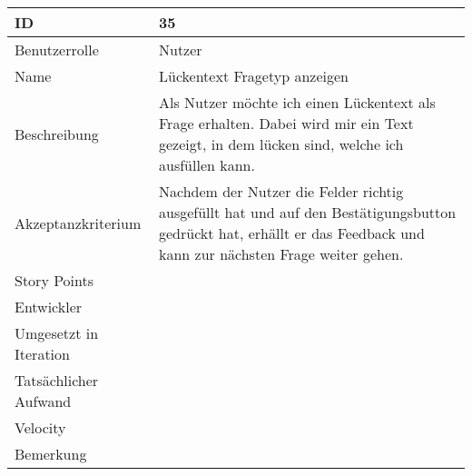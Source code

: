 \begin{tabularx}{\textwidth}{|p{}|X|}
	\hline
	ID & 35 \\
	\hline
	Benutzerrolle & Nutzer \\
	\hline
	Name & Lückentext Fragetyp anzeigen\\
	\hline
	Beschreibung & Als Nutzer möchte ich einen Lückentext als Frage erhalten. Dabei wird mir ein Text gezeigt, in dem lücken sind, welche ich ausfüllen kann. \\
	\hline
	Akzeptanzkriterium & Nachdem der Nutzer die Felder richtig ausgefüllt hat und auf den Bestätigungsbutton gedrückt hat, erhällt er das Feedback und kann zur nächsten Frage weiter gehen. \\
	\hline
	Story Points & \\
	\hline
	Entwickler & \\
	\hline
	Umgesetzt in Iteration & \\
	\hline
	Tatsächlicher Aufwand & \\
	\hline
	Velocity & \\
	\hline
	Bemerkung & \\
	\hline
\end{tabularx}
\vspace{20pt}
